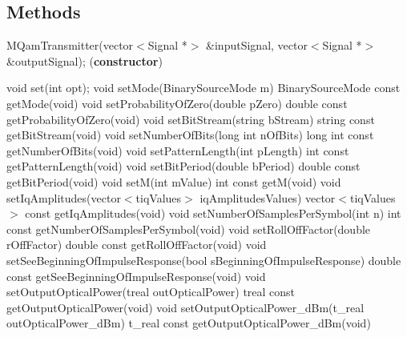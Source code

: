 \begin{itemize}

\pagebreak

\subsection*{Methods}

MQamTransmitter(vector$<$Signal *$>$ \&inputSignal, vector$<$Signal *$>$ \&outputSignal); (\textbf{constructor})
\bigbreak

void set(int opt);
\bigbreak
void setMode(BinarySourceMode m)
\bigbreak
BinarySourceMode const getMode(void)
\bigbreak
void setProbabilityOfZero(double pZero)
\bigbreak
double const getProbabilityOfZero(void)
\bigbreak
void setBitStream(string bStream)
\bigbreak
string const getBitStream(void)
\bigbreak
void setNumberOfBits(long int nOfBits)
\bigbreak
long int const getNumberOfBits(void)
\bigbreak
void setPatternLength(int pLength)
\bigbreak
int const getPatternLength(void)
\bigbreak
void setBitPeriod(double bPeriod)
\bigbreak
double const getBitPeriod(void)
\bigbreak
void setM(int mValue)
int const getM(void)
\bigbreak
void setIqAmplitudes(vector$<$t\textunderscore iqValues$>$ iqAmplitudesValues)
\bigbreak
vector$<$t\textunderscore iqValues$>$ const getIqAmplitudes(void)
\bigbreak
void setNumberOfSamplesPerSymbol(int n)
\bigbreak
int const getNumberOfSamplesPerSymbol(void)
\bigbreak
void setRollOffFactor(double rOffFactor)
\bigbreak
double const getRollOffFactor(void)
\bigbreak
void setSeeBeginningOfImpulseResponse(bool sBeginningOfImpulseResponse)
\bigbreak
double const getSeeBeginningOfImpulseResponse(void)
\bigbreak
void setOutputOpticalPower(t\textunderscore real outOpticalPower)
\bigbreak
t\textunderscore real const getOutputOpticalPower(void)
\bigbreak
void setOutputOpticalPower\_dBm(t\_real outOpticalPower\_dBm)
\bigbreak
t\_real const getOutputOpticalPower\_dBm(void)
\pagebreak


\end{itemize}
